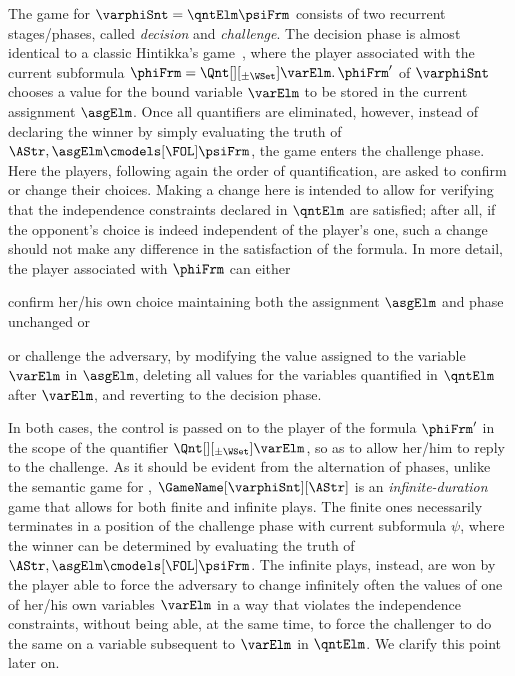\documentclass[authoryear]{elsarticle}
\begin{document}
The game for $\varphiSnt = \qntElm \psiFrm$ consists of two recurrent
stages/phases, called \emph{decision} and \emph{challenge}.
The decision phase is almost identical to a classic Hintikka's \FOL
game~\citep{HS97}, where the player associated with the current subformula
$\phiFrm = \Qnt[][_{\pm\WSet}] \varElm \ldotp \phiFrm'$ of $\varphiSnt$ chooses
a value for the bound variable $\varElm$ to be stored in the current assignment
$\asgElm$.
Once all quantifiers are eliminated, however, instead of declaring the winner by
simply evaluating the truth of $\AStr, \asgElm \cmodels[\FOL] \psiFrm$, the game
enters the challenge phase.
Here the players, following again the order of quantification, are asked to
confirm or change their choices.
Making a change here is intended to allow for verifying that the independence
constraints declared in $\qntElm$ are satisfied; after all, if the opponent's
choice is indeed independent of the player's one, such a change should not make
any difference in the satisfaction of the formula.
In more detail, the player associated with $\phiFrm$ can either
\begin{inparaenum}[(i)]
  \item
    confirm her/his own choice maintaining both the assignment $\asgElm$ and
    phase unchanged or
  \item
    or challenge the adversary, by modifying the value assigned to the variable
    $\varElm$ in $\asgElm$, deleting all values for the variables quantified in
    $\qntElm$ after $\varElm$, and reverting to the decision phase.
\end{inparaenum}
In both cases, the control is passed on to the player of the formula $\phiFrm'$
in the scope of the quantifier $\Qnt[][_{\pm\WSet}] \varElm$, so as to allow
her/him to reply to the challenge.
As it should be evident from the alternation of phases, unlike the semantic game
for \FOL, $\GameName[\varphiSnt][\AStr]$ is an \emph{infinite-duration} game
that allows for both finite and infinite plays.
The finite ones necessarily terminates in a position of the challenge phase with
current subformula $\psi$, where the winner can be determined by evaluating the
truth of $\AStr, \asgElm \cmodels[\FOL] \psiFrm$.
The infinite plays, instead, are won by the player able to force the adversary
to change infinitely often the values of one of her/his own variables $\varElm$
in a way that violates the independence constraints, without being able, at the
same time, to force the challenger to do the same on a variable subsequent to
$\varElm$ in $\qntElm$.
We clarify this point later on.
\end{document}
